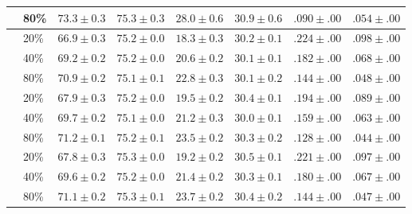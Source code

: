 \begin{table}[hbtp]
\begin{adjustwidth}{-2cm}{}
\begin{tabulary}{179mm}{llrrrrrr}
                        & 80\% & $73.3\pm0.3$ & $75.3\pm0.3$ & $28.0\pm0.6$ & $30.9\pm0.6$ & $.090\pm.00$ & $.054\pm.00$ \\
\midrule
{} & 20\% & $66.9\pm0.3$ & $75.2\pm0.0$ & $18.3\pm0.3$ & $30.2\pm0.1$ & $.224\pm.00$ & $.098\pm.00$ \\
                        & 40\% & $69.2\pm0.2$ & $75.2\pm0.0$ & $20.6\pm0.2$ & $30.1\pm0.1$ & $.182\pm.00$ & $.068\pm.00$ \\
                        & 80\% & $70.9\pm0.2$ & $75.1\pm0.1$ & $22.8\pm0.3$ & $30.1\pm0.2$ & $.144\pm.00$ & $.048\pm.00$ \\
\midrule
{} & 20\% & $67.9\pm0.3$ & $75.2\pm0.0$ & $19.5\pm0.2$ & $30.4\pm0.1$ & $.194\pm.00$ & $.089\pm.00$ \\
                        & 40\% & $69.7\pm0.2$ & $75.1\pm0.0$ & $21.2\pm0.3$ & $30.0\pm0.1$ & $.159\pm.00$ & $.063\pm.00$ \\
                        & 80\% & $71.2\pm0.1$ & $75.2\pm0.1$ & $23.5\pm0.2$ & $30.3\pm0.2$ & $.128\pm.00$ & $.044\pm.00$ \\
\midrule
{} & 20\% & $67.8\pm0.3$ & $75.3\pm0.0$ & $19.2\pm0.2$ & $30.5\pm0.1$ & $.221\pm.00$ & $.097\pm.00$ \\
                        & 40\% & $69.6\pm0.2$ & $75.2\pm0.0$ & $21.4\pm0.2$ & $30.3\pm0.1$ & $.180\pm.00$ & $.067\pm.00$ \\
                        & 80\% & $71.1\pm0.2$ & $75.3\pm0.1$ & $23.7\pm0.2$ & $30.4\pm0.2$ & $.144\pm.00$ & $.047\pm.00$ \\
    \bottomrule
  \end{tabulary}
\end{adjustwidth}
\end{table}
